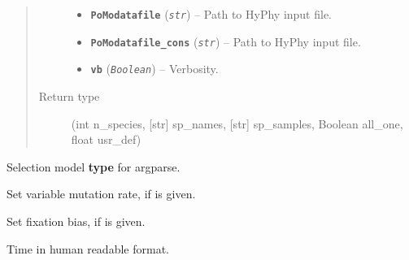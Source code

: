 \documentclass[letterpaper,10pt,english]{sphinxmanual}
\begin{document}
\begin{fulllineitems}
\begin{quote}
\begin{description}
\begin{itemize}
\item {} 
\textbf{\texttt{PoModatafile}} (\emph{\texttt{str}}) -- Path to HyPhy input file.

\item {} 
\textbf{\texttt{PoModatafile\_cons}} (\emph{\texttt{str}}) -- Path to HyPhy input file.

\item {} 
\textbf{\texttt{vb}} (\emph{\texttt{Boolean}}) -- Verbosity.

\end{itemize}

\item[{Return type}] \leavevmode
(int n\_species, {[}str{]} sp\_names, {[}str{]} sp\_samples, Boolean all\_one,
float usr\_def)

\end{description}\end{quote}

\end{fulllineitems}


\begin{fulllineitems}
\label{main:libPoMo.main.selModel}
Selection model \textbf{type} for argparse.

\end{fulllineitems}


\begin{fulllineitems}
\label{main:libPoMo.main.setGM}
Set variable mutation rate, if  is given.

\end{fulllineitems}


\begin{fulllineitems}
\label{main:libPoMo.main.setGS}
Set fixation bias, if  is given.

\end{fulllineitems}


\begin{fulllineitems}
\label{main:libPoMo.main.timeStr}
Time in human readable format.

\end{fulllineitems}
\end{document}
